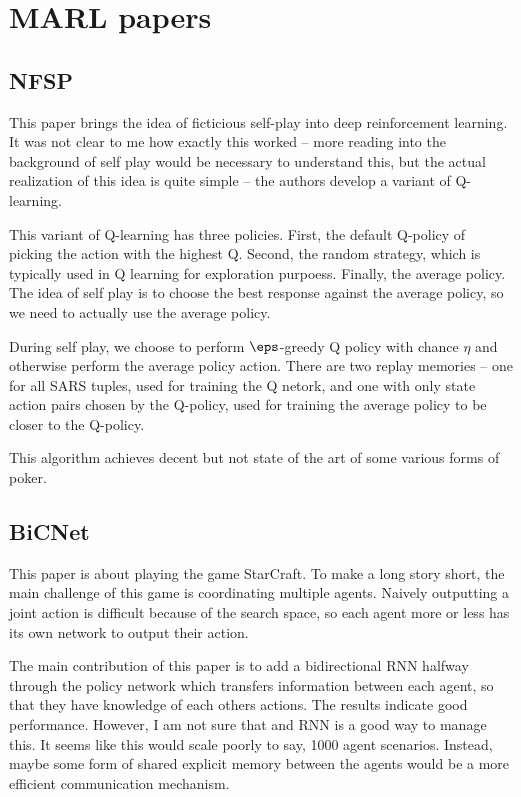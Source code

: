 \documentclass[12pt]{article}
\begin{document}

\section{MARL papers}

\subsection{NFSP \cite{NFSP}}

This paper brings the idea of ficticious self-play into deep reinforcement learning. It was not clear to me how exactly this worked -- more reading into the background of self play would be necessary to understand this, but the actual realization of this idea is quite simple -- the authors develop a variant of Q-learning.

This variant of Q-learning has three policies. First, the default Q-policy of picking the action with the highest Q. Second, the random strategy, which is typically used in Q learning for exploration purpoess. Finally, the average policy. The idea of self play is to choose the best response against the average policy, so we need to actually use the average policy.

During self play, we choose to perform $\eps$-greedy Q policy with chance $\eta$ and otherwise perform the average policy action. There are two replay memories -- one for all SARS tuples, used for training the Q netork, and one with only state action pairs chosen by the Q-policy, used for training the average policy to be closer to the Q-policy.

This algorithm achieves decent but not state of the art of some various forms of poker.

\subsection{BiCNet \cite{Bicnet}}

This paper is about playing the game StarCraft. To make a long story short, the main challenge of this game is coordinating multiple agents. Naively outputting a joint action is difficult because of the search space, so each agent more or less has its own network to output their action.

The main contribution of this paper is to add a bidirectional RNN halfway through the policy network which transfers information between each agent, so that they have knowledge of each others actions. The results indicate good performance. However, I am not sure that and RNN is a good way to manage this. It seems like this would scale poorly to say, 1000 agent scenarios. Instead, maybe some form of shared explicit memory between the agents would be a more efficient communication mechanism. 
\end{document}
